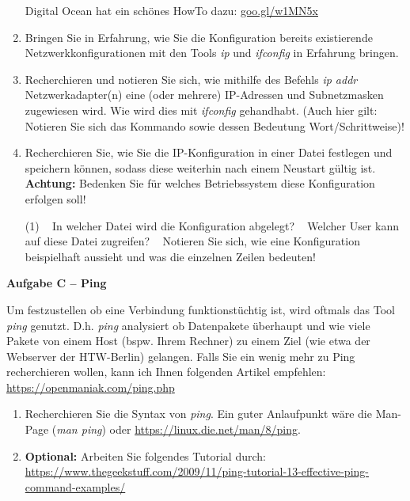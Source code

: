 \documentclass[paper=a4,fontsize=11pt]{scrartcl}%
\numberwithin{equation}{section}
\begin{document}
\begin{enumerate}
	Digital Ocean hat ein schönes HowTo dazu: \url{goo.gl/w1MN5x}
 	\item Bringen Sie in Erfahrung, wie Sie die Konfiguration bereits existierende Netzwerkkonfigurationen mit den Tools \emph{ip} und \emph{ifconfig} in Erfahrung bringen.
	\item Recherchieren und notieren Sie sich, wie mithilfe des Befehls \emph{ip addr} Netzwerkadapter(n) eine (oder mehrere) IP-Adressen und Subnetzmasken zugewiesen wird. Wie wird dies mit \emph{ifconfig} gehandhabt. (Auch hier gilt: Notieren Sie sich das Kommando sowie dessen Bedeutung Wort/Schrittweise)!
	\item Recherchieren Sie, wie Sie die IP-Konfiguration in einer Datei festlegen und speichern können, sodass diese weiterhin nach einem Neustart gültig ist.\\
	\textbf{Achtung:} Bedenken Sie für welches Betriebssystem diese Konfiguration erfolgen soll!
	\begin{tasks}(1)
		\task~ In welcher Datei wird die Konfiguration abgelegt?
		\task~ Welcher User kann auf diese Datei zugreifen?
		\task~ Notieren Sie sich, wie eine Konfiguration beispielhaft aussieht und was die einzelnen Zeilen bedeuten!
	\end{tasks}
\end{enumerate}

\begin{center}\Large{\textbf{Aufgabe C -- Ping}}\end{center}\vskip0.25in
Um festzustellen ob eine Verbindung funktionstüchtig ist, wird oftmals das Tool \emph{ping} genutzt. D.h. \emph{ping} analysiert ob Datenpakete überhaupt und wie viele Pakete von einem Host (bspw. Ihrem Rechner) zu einem Ziel (wie etwa der Webserver der HTW-Berlin) gelangen. Falls Sie ein wenig mehr zu Ping recherchieren wollen, kann ich Ihnen folgenden Artikel empfehlen: \url{https://openmaniak.com/ping.php}
\begin{enumerate}
	\item Recherchieren Sie die Syntax von \emph{ping}. Ein guter Anlaufpunkt wäre die Man-Page (\emph{man ping}) oder \url{https://linux.die.net/man/8/ping}.
	\item \textbf{Optional:} Arbeiten Sie folgendes Tutorial durch: \url{https://www.thegeekstuff.com/2009/11/ping-tutorial-13-effective-ping-command-examples/}
\end{enumerate}
\end{document}
